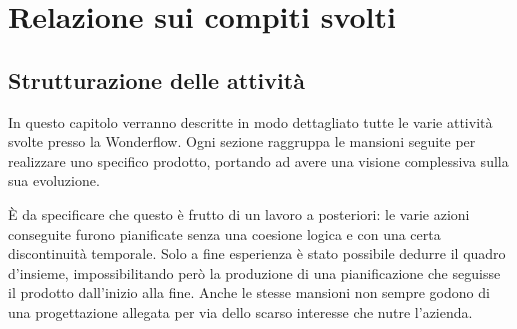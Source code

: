 \chapter{Relazione sui compiti svolti}
\label{cap:relazione}

\section{Strutturazione delle attività}
In questo capitolo verranno descritte in modo dettagliato tutte le varie
attività svolte presso la Wonderflow. Ogni sezione raggruppa le mansioni seguite
per realizzare uno specifico prodotto, portando ad avere una visione complessiva
sulla sua evoluzione.

È da specificare che questo è frutto di un lavoro a posteriori: le varie azioni
conseguite furono pianificate senza una coesione logica e con una certa
discontinuità temporale. Solo a fine esperienza è stato possibile dedurre il
quadro d'insieme, impossibilitando però la produzione di una pianificazione che
seguisse il prodotto dall'inizio alla fine. Anche le stesse mansioni non sempre
godono di una progettazione allegata per via dello scarso interesse che nutre
l'azienda.


